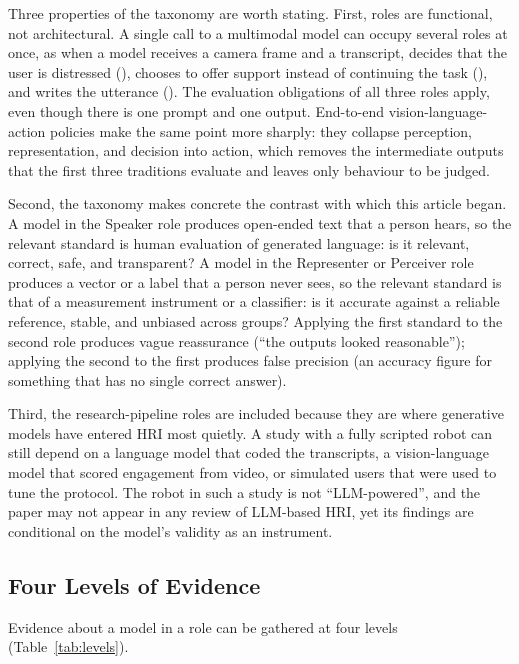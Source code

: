 Three properties of the taxonomy are worth stating. First, roles are
functional, not architectural. A single call to a multimodal model can occupy
several roles at once, as when a model receives a camera frame and a
transcript, decides that the user is distressed (), chooses to offer
support instead of continuing the task (), and writes the utterance
(). The evaluation obligations of all three roles apply, even though
there is one prompt and one output. End-to-end vision-language-action
policies make the same point more sharply: they collapse perception,
representation, and decision into action, which removes the intermediate
outputs that the first three traditions evaluate and leaves only behaviour to
be judged.

Second, the taxonomy makes concrete the contrast with which this article
began. A model in the Speaker role produces open-ended text that a person
hears, so the relevant standard is human evaluation of generated language:
is it relevant, correct, safe, and transparent? A model in the Representer or
Perceiver role produces a vector or a label that a person never sees, so the
relevant standard is that of a measurement instrument or a classifier: is it
accurate against a reliable reference, stable, and unbiased across groups?
Applying the first standard to the second role produces vague reassurance
(``the outputs looked reasonable''); applying the second to the first produces
false precision (an accuracy figure for something that has no single correct
answer).

Third, the research-pipeline roles are included because they are where
generative models have entered HRI most quietly. A study with a fully
scripted robot can still depend on a language model that coded the
transcripts, a vision-language model that scored engagement from video, or
simulated users that were used to tune the protocol. The robot in such a
study is not ``LLM-powered'', and the paper may not appear in any review of
LLM-based HRI, yet its findings are conditional on the model's validity as an
instrument.

\subsection{Four Levels of Evidence}
\label{sec:levels}

Evidence about a model in a role can be gathered at four levels
(Table~\ref{tab:levels}).

